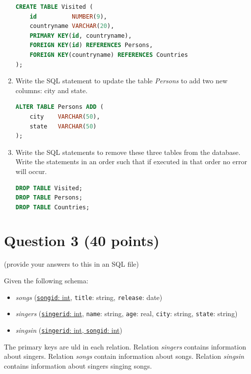 \documentclass[letterpaper, 11pt]{article}
\begin{document}
\begin{enumerate}[label={\alph*})]
\begin{tcolorbox}
\begin{lstlisting}[language=SQL]
CREATE TABLE Visited (
    id          NUMBER(9),
    countryname VARCHAR(20),
    PRIMARY KEY(id, countryname),
    FOREIGN KEY(id) REFERENCES Persons,
    FOREIGN KEY(countryname) REFERENCES Countries
);
    \end{lstlisting}
    \end{tcolorbox}
    
    \item Write the SQL statement to update the table \textit{Persons} to add two new columns: city and state.
    \begin{tcolorbox}
    \begin{lstlisting}[language=SQL]
ALTER TABLE Persons ADD (
    city    VARCHAR(50),
    state   VARCHAR(50)
);
    \end{lstlisting}   
    \end{tcolorbox}
    
    
    \item Write the SQL statements to remove these three tables from the database. Write the statements in an order such that if executed in that order no error will occur.
    \begin{tcolorbox}
    \begin{lstlisting}[language=SQL]
DROP TABLE Visited;
DROP TABLE Persons;
DROP TABLE Countries;
    \end{lstlisting}
    \end{tcolorbox}
    
\end{enumerate}

\section*{Question 3 (40 points)}

(provide your answers to this in an SQL file)

Given the following schema:
\begin{itemize}
    \item \textit{songs} (\ul{\texttt{songid}: int}, \texttt{title}: string, \texttt{release}: date)
    \item \textit{singers} (\ul{\texttt{singerid}: int}, \texttt{name}: string, \texttt{age}: real, \texttt{city}: string, \texttt{state}: string)
    \item \textit{singsin} (\ul{\texttt{singerid}: int, \texttt{songid}: int})
\end{itemize}

The primary keys are uld in each relation. Relation \textit{singers} contains information about singers. Relation \textit{songs} contain information about songs. Relation \textit{singsin} contains information about singers singing songs.
\end{document}
